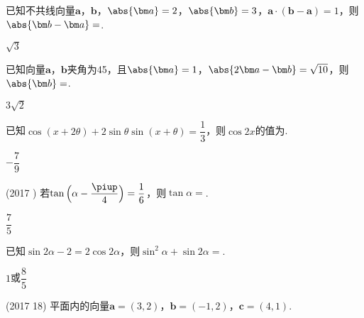 \begin{exercise}
\begin{answer}
    \end{answer}
  \item%
    已知不共线向量$\bm a$，$\bm b$，$\abs{\bm a}=2$，$\abs{\bm b}=3$，$\bm a\cdot(\bm b-\bm a)=1$，则$\abs{\bm b-\bm a}=$\tk.
    \begin{answer}
      $\sqrt{3}$
    \end{answer}
  \item%
    已知向量$\bm a$，$\bm b$夹角为45\degree，且$\abs{\bm a}=1$，$\abs{2\bm a-\bm b}=\sqrt{10}$，则$\abs{\bm b}=$\tk.
    \begin{answer}
      $3\sqrt{2}$
    \end{answer}
  \item%
    已知$\cos(x+2\theta)+2\sin\theta\sin(x+\theta)=\dfrac{1}3$，则$\cos{2x}$的值为\tk.
    \begin{answer}
      $-\dfrac{7}9$
    \end{answer}
  \item%
    (2017 )
    若$\tan{\Bigl(\alpha-\dfrac{\piup}4\Bigr)}=\dfrac{1}6$，则$\tan\alpha=$\tk.
    \begin{answer}
      $\dfrac{7}5$
    \end{answer}
  \item%
    已知$\sin{2\alpha}-2=2\cos{2\alpha}$，则$\sin^2\alpha+\sin{2\alpha}=$\tk.
    \begin{answer}
      $1$或$\dfrac{8}5$
    \end{answer}
  \item%
    (2017  18)
    平面内的向量$\bm a=(3,2)$，$\bm b=(-1,2)$，$\bm c=(4,1)$.\\

\end{exercise}
